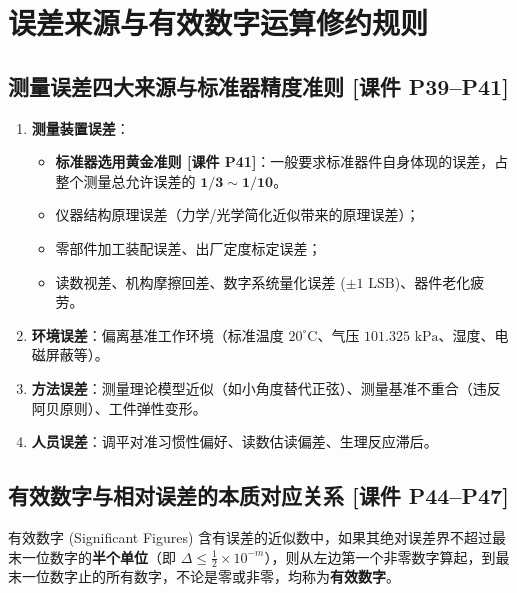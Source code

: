\documentclass[11pt,a4paper]{ctexart}
\begin{document}
\section{误差来源与有效数字运算修约规则}

\subsection{测量误差四大来源与标准器精度准则 \textnormal{[课件 P39--P41]}}

\begin{enumerate}
    \item \textbf{测量装置误差}：
    \begin{itemize}
        \item \textbf{标准器选用黄金准则 [课件 P41]}：一般要求标准器件自身体现的误差，占整个测量总允许误差的 $\mathbf{1/3 \sim 1/10}$。
        \item 仪器结构原理误差（力学/光学简化近似带来的原理误差）；
        \item 零部件加工装配误差、出厂定度标定误差；
        \item 读数视差、机构摩擦回差、数字系统量化误差 ($\pm 1 \text{ LSB}$)、器件老化疲劳。
    \end{itemize}
    \item \textbf{环境误差}：偏离基准工作环境（标准温度 $20^\circ\text{C}$、气压 $101.325\text{ kPa}$、湿度、电磁屏蔽等）。
    \item \textbf{方法误差}：测量理论模型近似（如小角度替代正弦）、测量基准不重合（违反阿贝原则）、工件弹性变形。
    \item \textbf{人员误差}：调平对准习惯性偏好、读数估读偏差、生理反应滞后。
\end{enumerate}

\subsection{有效数字与相对误差的本质对应关系 \textnormal{[课件 P44--P47]}}

\begin{defbox}{有效数字 (Significant Figures)}
含有误差的近似数中，如果其绝对误差界不超过最末一位数字的\textbf{半个单位}（即 $\Delta \le \frac{1}{2} \times 10^{-m}$），则从左边第一个非零数字算起，到最末一位数字止的所有数字，不论是零或非零，均称为\textbf{有效数字}。
\end{defbox}
\end{document}
